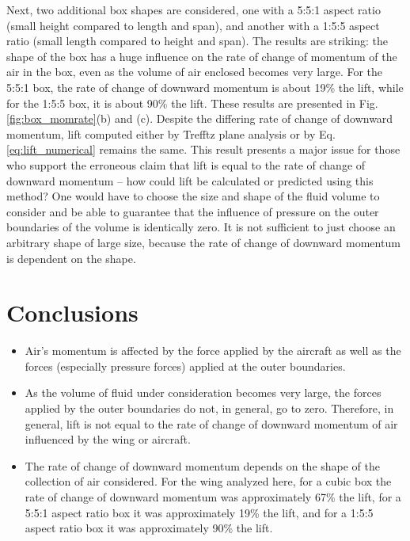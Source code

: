 \documentclass[11pt]{article}
\begin{document}
Next, two additional box shapes are considered, one with a 5:5:1 aspect ratio
(small height compared to length and span), and another with a 1:5:5 aspect
ratio (small length compared to height and span). The results are striking: the
shape of the box has a huge influence on the rate of change of momentum of the
air in the box, even as the volume of air enclosed becomes very large. For the
5:5:1 box, the rate of change of downward momentum is about 19\% the lift, while
for the 1:5:5 box, it is about 90\% the lift. These results are presented in
Fig. \ref{fig:box_momrate}(b) and (c). Despite the differing rate of change of
downward momentum, lift computed either by
Trefftz plane analysis or by Eq. \ref{eq:lift_numerical} remains the same. This
result
presents a major issue for those who support the erroneous claim that lift is
equal to the rate of change of downward momentum -- how could lift be
calculated or predicted using this method? One would have to choose the
size and shape of the fluid volume to consider and be able to guarantee that
the influence of pressure on the outer boundaries of the volume is identically
zero. It is not sufficient to just choose an arbitrary shape of large size,
because the rate of change of downward momentum is dependent on the shape.

\section{Conclusions}

\begin{itemize}
  \item Air's momentum is affected by the force applied by the aircraft as well
        as the forces (especially pressure forces) applied at the outer
        boundaries.
  \item As the volume of fluid under consideration becomes very large, the
        forces applied by the outer boundaries do not, in general, go to zero.
        Therefore, in
        general, lift is not equal to the rate of change of downward momentum of
        air influenced by the wing or aircraft.
  \item The rate of change of downward momentum depends on the shape of the
        collection of air considered. For the wing analyzed here, for a cubic
        box
        the rate of change of downward momentum was approximately 67\% the lift,
        for a 5:5:1 aspect ratio box it was approximately 19\% the lift, and for
        a 1:5:5 aspect ratio box it was approximately 90\% the lift.
\end{itemize}
\end{document}
